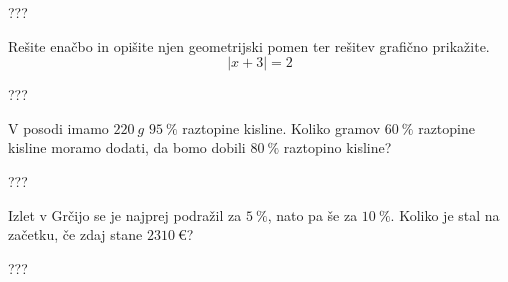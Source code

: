 \documentclass[addpoints,12pt]{exam}
\begin{document}
\begin{questions}
    
    
    \begin{solution}[10cm]
        ???
    \end{solution}



    \newpage

    \question[5]
    Rešite enačbo in opišite njen geometrijski pomen ter rešitev grafično prikažite.
    $$  \left\lvert x+3\right\rvert=2 $$
    
    
    \begin{solution}[8cm]
        ???
    \end{solution}





    
    


    \newpage

    \question[4]
    V posodi imamo $220~g$ $95~\%$ raztopine kisline. Koliko gramov $60~\%$ raztopine kisline moramo dodati, da bomo dobili $80~\%$ raztopino kisline?
    
    
    \begin{solution}[7cm]
        ???
    \end{solution}



    \newpage

    \question[4]
    Izlet v Grčijo se je najprej podražil za $5~\%$, nato pa še za $10~\%$. 
    Koliko je stal na začetku, če zdaj stane $2310~€$?
    
    
    \begin{solution}[3cm]
        ???
    \end{solution}

     \newpage



    

\end{questions}
\end{document}
